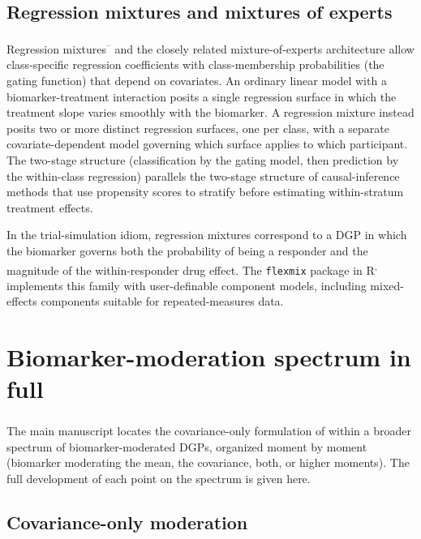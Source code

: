 \documentclass[
  11pt,
]{article}
\begin{document}
\subsection{Regression mixtures and mixtures of experts}\label{regression-mixtures-and-mixtures-of-experts}

Regression mixtures\textsuperscript{--}
and the closely related mixture-of-experts architecture\textsuperscript{}
allow class-specific regression coefficients with class-membership
probabilities (the gating function) that depend on covariates. An
ordinary linear model with a biomarker-treatment interaction posits
a single regression surface in which the treatment slope varies
smoothly with the biomarker. A regression mixture instead posits two or
more distinct regression surfaces, one per class, with a separate
covariate-dependent model governing which surface applies to which
participant. The two-stage structure (classification by the gating
model, then prediction by the within-class regression) parallels the
two-stage structure of causal-inference methods that use propensity
scores to stratify before estimating within-stratum treatment effects.

In the trial-simulation idiom, regression mixtures correspond to a DGP
in which the biomarker governs both the probability of being a
responder and the magnitude of the within-responder drug effect. The
\texttt{flexmix} package in R\textsuperscript{,} implements
this family with user-definable component models, including
mixed-effects components suitable for repeated-measures data.

\section{Biomarker-moderation spectrum in full}\label{biomarker-moderation-spectrum-in-full}

The main manuscript locates the covariance-only formulation of\textsuperscript{} within a broader spectrum of biomarker-moderated
DGPs, organized moment by moment (biomarker moderating the mean, the
covariance, both, or higher moments). The full development of each
point on the spectrum is given here.

\subsection{Covariance-only moderation}\label{covariance-only-moderation}
\end{document}
